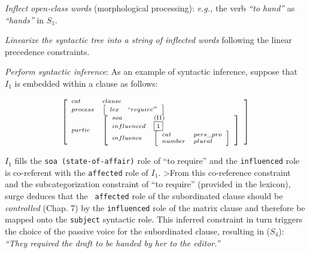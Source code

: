 \begin{zenumerate}
\item {\em Inflect open-class words} (morphological processing): {\em
    e.g.,} the verb {\em ``to hand''} as {\em ``hands''} in $S_1$.

\item {\em Linearize the syntactic tree into a string of inflected words}
following the linear precedence constraints.

\item {\em Perform syntactic inference}: As an example of syntactic
  inference, suppose that $I_1$ is embedded within a clause as follows:
\end{zenumerate}

\[ \left[ \scriptsize \begin{array}{ll}
cat & clause\\
process & \left[ \begin{array}{ll}
          lex & ``require''\\
          \end{array} \right] \\
partic &  \left[ \begin{array}{ll}
          soa & ($I1$)\\
          influenced & \fbox{1}\\
          influence & \left[ \begin{array}{ll}
                      cat & pers\_pro\\
                      number & plural
                      \end{array} \right] \\
             \end{array} \right] \\
\end{array} \right] \]                         

$I_1$ fills the {\tt soa (state-of-affair)} role of ``to require'' and the
{\tt influenced} role is co-referent with the {\tt affected} role of $I_1$.
>From this co-reference constraint and the subcategorization constraint of
``to require'' (provided in the lexicon), {\sc surge} deduces that the {\tt
  affected} role of the subordinated clause should be {\em controlled}
\cite{pollard-sag94} (Chap. 7) by the {\tt influenced} role of the matrix
clause and therefore be mapped onto the {\tt subject} syntactic role. This
inferred constraint in turn triggers the choice of the passive voice for
the subordinated clause, resulting in ($S_4$): {\em ``They required the
  draft to be handed by her to the editor.''}


